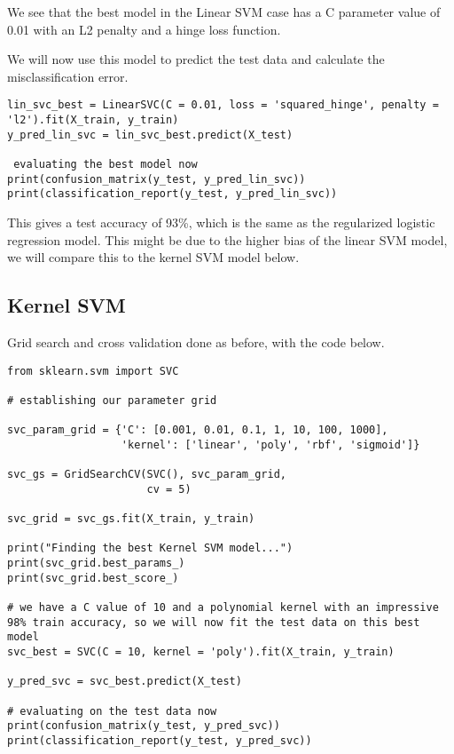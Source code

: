\documentclass[12pt, letterpaper]{article}
\begin{document}
We see that the best model in the Linear SVM case has a C parameter value of 0.01 with an L2 penalty and a hinge loss function. 

We will now use this model to predict the test data and calculate the misclassification error. 

\begin{verbatim} 
lin_svc_best = LinearSVC(C = 0.01, loss = 'squared_hinge', penalty = 'l2').fit(X_train, y_train) 
y_pred_lin_svc = lin_svc_best.predict(X_test)

 evaluating the best model now 
print(confusion_matrix(y_test, y_pred_lin_svc))
print(classification_report(y_test, y_pred_lin_svc))
\end{verbatim} 

This gives a test accuracy of 93\%, which is the same as the regularized logistic regression model. This might be due to the higher bias of the linear SVM model, we will compare this to the kernel SVM model below. 

\subsection{Kernel SVM} 

Grid search and cross validation done as before, with the code below. 

\begin{verbatim} 
from sklearn.svm import SVC 

# establishing our parameter grid

svc_param_grid = {'C': [0.001, 0.01, 0.1, 1, 10, 100, 1000],
                  'kernel': ['linear', 'poly', 'rbf', 'sigmoid']}

svc_gs = GridSearchCV(SVC(), svc_param_grid, 
                      cv = 5)

svc_grid = svc_gs.fit(X_train, y_train)

print("Finding the best Kernel SVM model...") 
print(svc_grid.best_params_) 
print(svc_grid.best_score_) 

# we have a C value of 10 and a polynomial kernel with an impressive 98% train accuracy, so we will now fit the test data on this best model 
svc_best = SVC(C = 10, kernel = 'poly').fit(X_train, y_train)

y_pred_svc = svc_best.predict(X_test)

# evaluating on the test data now 
print(confusion_matrix(y_test, y_pred_svc)) 
print(classification_report(y_test, y_pred_svc)) 
\end{verbatim} 
\end{document}
